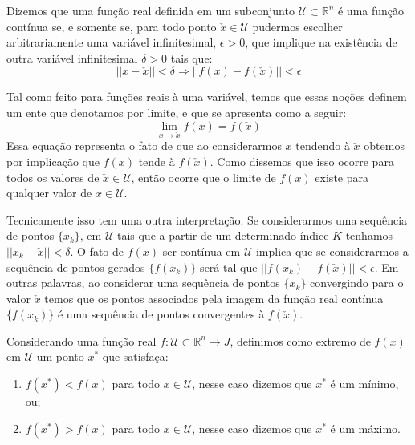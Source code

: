 \begin{definition}
  Dizemos que uma função real definida em um subconjunto $\mathcal{U} \subset \mathbb{R}^n$ é uma função contínua se, e somente se, para todo ponto $\check{x} \in \mathcal{U}$ pudermos escolher arbitrariamente uma variável infinitesimal, $\epsilon > 0$, que implique na existência de outra variável infinitesimal $\delta>0$ tais que:
  \begin{equation}
    ||x - \check{x}|| < \delta \Rightarrow ||f(x) - f(\check{x})|| < \epsilon
  \end{equation}
\end{definition}

\par Tal como feito para funções reais à uma variável, temos que essas noções definem um ente que denotamos por limite, e que se apresenta como a seguir:
\begin{equation}
  \lim_{x \rightarrow \check{x}}f(x)= f(\check{x})
\end{equation}
Essa equação representa o fato de que ao considerarmos $x$ tendendo à $\check{x}$ obtemos por implicação que $f(x)$ tende à $f(\check{x})$. Como dissemos que isso ocorre para todos os valores de $\check{x} \in \mathcal{U}$, então ocorre que o limite de $f(x)$ existe para qualquer valor de $x \in \mathcal{U}$.

\par  Tecnicamente isso tem uma outra interpretação. Se considerarmos uma sequência de pontos $\{x_k\}$, em $\mathcal{U}$ tais que a partir de um determinado índice $K$ tenhamos $||x_k - \check{x}|| < \delta$. O fato de $f(x)$ ser contínua em $\mathcal{U}$ implica que se considerarmos a sequência de pontos gerados $\{f(x_k)\}$ será tal que $||f(x_k) - f(\check{x})|| < \epsilon$. Em outras palavras, ao considerar uma sequência de pontos $\{x_k\}$ convergindo para o valor $\check{x}$ temos que os pontos associados pela imagem da função real contínua $\{f(x_k)\}$ é uma sequência de pontos convergentes à $f(\check{x})$.

\begin{definition}[Extremos de $f(x)$]
  Considerando uma função real $f : \mathcal{U} \subset \mathbb{R}^n \rightarrow J$, definimos como extremo de $f(x)$ em $\mathcal{U}$ um ponto $x^*$ que satisfaça:
  \begin{enumerate}
  \item $f(x^*) < f(x)$ para todo $x \in \mathcal{U}$, nesse caso dizemos que $x^*$ é um mínimo, ou;
  \item $f(x^*) > f(x)$ para todo $x \in \mathcal{U}$, nesse caso dizemos que $x^*$ é um máximo.
  \end{enumerate}
\end{definition}



